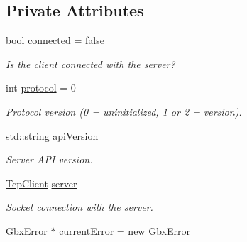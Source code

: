 \subsection*{Private Attributes}
\begin{DoxyCompactItemize}
\item 
\hypertarget{classGbxRemote_a56662ea222345c645ae897e056b5c8c8}{bool \hyperlink{classGbxRemote_a56662ea222345c645ae897e056b5c8c8}{connected} = false}\label{classGbxRemote_a56662ea222345c645ae897e056b5c8c8}

\begin{DoxyCompactList}\small\item\em Is the client connected with the server? \end{DoxyCompactList}\item 
\hypertarget{classGbxRemote_a5ee5c7087085cb6cb2e7bc6135ff0646}{int \hyperlink{classGbxRemote_a5ee5c7087085cb6cb2e7bc6135ff0646}{protocol} = 0}\label{classGbxRemote_a5ee5c7087085cb6cb2e7bc6135ff0646}

\begin{DoxyCompactList}\small\item\em Protocol version (0 = uninitialized, 1 or 2 = version). \end{DoxyCompactList}\item 
\hypertarget{classGbxRemote_a81d3c0c70ab7f5e585840e9978ee900e}{std\-::string \hyperlink{classGbxRemote_a81d3c0c70ab7f5e585840e9978ee900e}{api\-Version}}\label{classGbxRemote_a81d3c0c70ab7f5e585840e9978ee900e}

\begin{DoxyCompactList}\small\item\em Server A\-P\-I version. \end{DoxyCompactList}\item 
\hypertarget{classGbxRemote_a0b0b212b945da4266fb645affdac81cb}{\hyperlink{classTcpClient}{Tcp\-Client} \hyperlink{classGbxRemote_a0b0b212b945da4266fb645affdac81cb}{server}}\label{classGbxRemote_a0b0b212b945da4266fb645affdac81cb}

\begin{DoxyCompactList}\small\item\em Socket connection with the server. \end{DoxyCompactList}\item 
\hypertarget{classGbxRemote_ae5d44c3729140c1eba5e850cb5e5e7bd}{\hyperlink{structGbxError}{Gbx\-Error} $\ast$ \hyperlink{classGbxRemote_ae5d44c3729140c1eba5e850cb5e5e7bd}{current\-Error} = new \hyperlink{structGbxError}{Gbx\-Error}}\label{classGbxRemote_ae5d44c3729140c1eba5e850cb5e5e7bd}


\end{DoxyCompactItemize}
